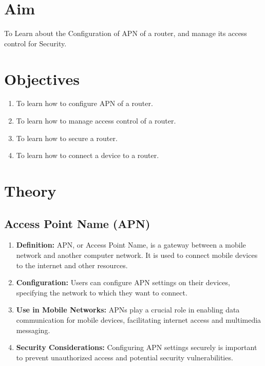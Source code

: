 \documentclass[11pt]{article}
\begin{document}
\tableofcontents
\thispagestyle{empty}
\clearpage

\setcounter{page}{1}

\section{Aim}
To Learn about the Configuration of APN of a router, and manage its access
control for Security.
\section{Objectives}
\begin{enumerate}
    \item To learn how to configure APN of a router.
    \item To learn how to manage access control of a router.
    \item To learn how to secure a router.
    \item To learn how to connect a device to a router.
\end{enumerate}

\section{Theory}
\subsection{Access Point Name (APN)}
\begin{enumerate}
  \item \textbf{Definition:} APN, or Access Point Name, is a gateway between a mobile network and another computer network. It is used to connect mobile devices to the internet and other resources.

  \item \textbf{Configuration:} Users can configure APN settings on their devices, specifying the network to which they want to connect.

  \item \textbf{Use in Mobile Networks:} APNs play a crucial role in enabling data communication for mobile devices, facilitating internet access and multimedia messaging.

  \item \textbf{Security Considerations:} Configuring APN settings securely is important to prevent unauthorized access and potential security vulnerabilities.
\end{enumerate}
\end{document}

